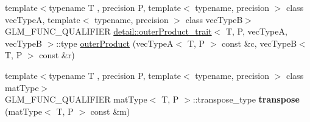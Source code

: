 \begin{DoxyCompactItemize}
\item 
{\footnotesize template$<$typename T , precision P, template$<$ typename, precision $>$ class vec\+TypeA, template$<$ typename, precision $>$ class vec\+TypeB$>$ }\\G\+L\+M\+\_\+\+F\+U\+N\+C\+\_\+\+Q\+U\+A\+L\+I\+F\+I\+ER \hyperlink{structglm_1_1detail_1_1outer_product__trait}{detail\+::outer\+Product\+\_\+trait}$<$ T, P, vec\+TypeA, vec\+TypeB $>$\+::type \hyperlink{group__core__func__matrix_gae9f513dc8e4f3ceb993669321b6d0f09}{outer\+Product} (vec\+TypeA$<$ T, P $>$ const \&c, vec\+TypeB$<$ T, P $>$ const \&r)
\item 
{\footnotesize template$<$typename T , precision P, template$<$ typename, precision $>$ class mat\+Type$>$ }\\G\+L\+M\+\_\+\+F\+U\+N\+C\+\_\+\+Q\+U\+A\+L\+I\+F\+I\+ER mat\+Type$<$ T, P $>$\+::transpose\+\_\+type {\bfseries transpose} (mat\+Type$<$ T, P $>$ const \&m)\hypertarget{namespaceglm_a44eaf0309b3d7a9e71e31b5d4a8dbaab}{}\label{namespaceglm_a44eaf0309b3d7a9e71e31b5d4a8dbaab}


\end{DoxyCompactItemize}
